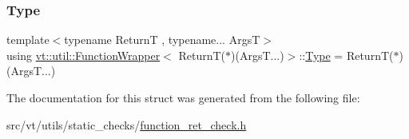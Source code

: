 \mbox{\label{structvt_1_1util_1_1_function_wrapper_3_01_return_t_07_5_08_07_args_t_8_8_8_08_4_a951becf6529bc9d27c0f4d46a09c59be}} 
\subsubsection{\texorpdfstring{Type}{Type}}
{\footnotesize\ttfamily template$<$typename ReturnT , typename... ArgsT$>$ \\
using \hyperlink{structvt_1_1util_1_1_function_wrapper}{vt\+::util\+::\+Function\+Wrapper}$<$ ReturnT($\ast$)(Args\+T...)$>$\+::\hyperlink{structvt_1_1util_1_1_function_wrapper_3_01_return_t_07_5_08_07_args_t_8_8_8_08_4_a951becf6529bc9d27c0f4d46a09c59be}{Type} =  ReturnT($\ast$)(Args\+T...)}



The documentation for this struct was generated from the following file\+:\begin{DoxyCompactItemize}
\item 
src/vt/utils/static\+\_\+checks/\hyperlink{function__ret__check_8h}{function\+\_\+ret\+\_\+check.\+h}\end{DoxyCompactItemize}
